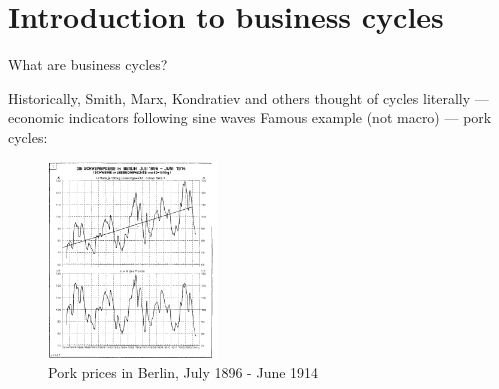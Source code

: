 \documentclass{beamer}
\newcommand{\tb}[1]{{\color{blue}{\textbf{#1}}}}
\newenvironment{mytemize}
{\vfill\itemize[nolistsep,itemsep=\fill,label=\color{blue}{$\triangleright$}]}
  {\enditemize}
\begin{document}
\section{Introduction to business cycles}
\begin{frame}{What are business cycles?}

  Historically, Smith, Marx, Kondratiev and others thought of cycles literally --- economic indicators following sine waves
  \vfill
  Famous example (not macro) --- pork cycles:
  \vfill
\begin{center}
\begin{figure}[h!]
	\includegraphics[clip,width=0.4\textwidth]{FIGURES/1_PorkCycle_a}
\caption{Pork prices in Berlin, July 1896 - June 1914}
\end{figure}
\end{center}

\end{frame}
%
\end{document}
